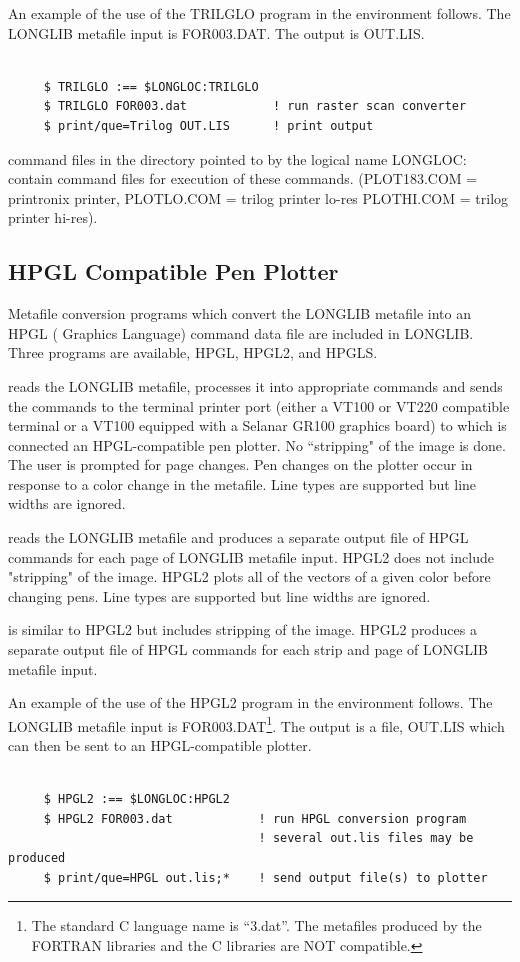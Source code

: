 \documentclass[11pt]{report}
\begin{document}
An example of the use of the TRILGLO program in the  environment
follows.  The LONGLIB metafile input is FOR003.DAT.  The output
is OUT.LIS.
\begin{verbatim}

     $ TRILGLO :== $LONGLOC:TRILGLO
     $ TRILGLO FOR003.dat            ! run raster scan converter
     $ print/que=Trilog OUT.LIS      ! print output

\end{verbatim}

  command files in the directory pointed to by the logical name
LONGLOC: contain command files for execution of these commands.
(PLOT183.COM = printronix printer, PLOTLO.COM = trilog printer lo-res
PLOTHI.COM = trilog printer hi-res).

\subsection{HPGL Compatible Pen Plotter}

Metafile conversion programs which convert the LONGLIB metafile into
an HPGL ( Graphics Language) command data file
are included in LONGLIB.  Three programs are available, HPGL, HPGL2,
and HPGLS.

 reads the LONGLIB metafile, processes it into appropriate commands and
sends the commands to the terminal printer port (either a VT100 or
VT220 compatible terminal or a VT100 equipped with a Selanar GR100
graphics board) to which is connected an HPGL-compatible pen plotter.
No ``stripping" of the image is done.  The user is prompted for page
changes.  Pen changes on the plotter occur in response to a color
change in the metafile.  Line types are supported but line widths are
ignored.

 reads the LONGLIB metafile and produces a separate output file of HPGL
commands for each page of LONGLIB metafile input.  HPGL2 does not
include "stripping" of the image.  HPGL2 plots all of the vectors of a
given color before changing
pens.  Line types are supported but line widths are ignored.

 is similar to HPGL2 but includes stripping of the image.
HPGL2 produces a separate output file of HPGL commands for each strip
and page of LONGLIB metafile input.

An example of the use of the HPGL2 program in the  environment
follows.  The LONGLIB metafile input is FOR003.DAT\footnote{The standard C
language name is ``3.dat''.  The metafiles produced by the FORTRAN
libraries and the C libraries are NOT compatible.}.  The output
is a file, OUT.LIS which can then be sent to an HPGL-compatible plotter.
\begin{verbatim}

     $ HPGL2 :== $LONGLOC:HPGL2
     $ HPGL2 FOR003.dat            ! run HPGL conversion program
                                   ! several out.lis files may be produced
     $ print/que=HPGL out.lis;*    ! send output file(s) to plotter
\end{verbatim}
\end{document}
